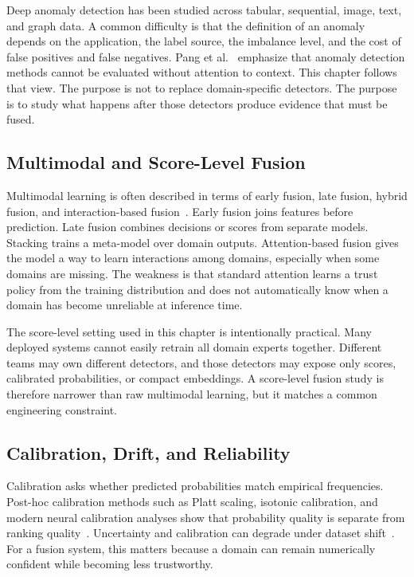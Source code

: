 \documentclass[11pt]{article}
\begin{document}
Deep anomaly detection has been studied across tabular, sequential, image, text,
and graph data. A common difficulty is that the definition of an anomaly depends
on the application, the label source, the imbalance level, and the cost of false
positives and false negatives. Pang et al.~\cite{pang2021deep} emphasize that
anomaly detection methods cannot be evaluated without attention to context. This
chapter follows that view. The purpose is not to replace domain-specific
detectors. The purpose is to study what happens after those detectors produce
evidence that must be fused.

\subsection{Multimodal and Score-Level Fusion}

Multimodal learning is often described in terms of early fusion, late fusion,
hybrid fusion, and interaction-based fusion~\cite{baltrusaitis2019multimodal}.
Early fusion joins features before prediction. Late fusion combines decisions
or scores from separate models. Stacking trains a meta-model over domain
outputs. Attention-based fusion gives the model a way to learn interactions
among domains, especially when some domains are missing. The weakness is that
standard attention learns a trust policy from the training distribution and
does not automatically know when a domain has become unreliable at inference
time.

The score-level setting used in this chapter is intentionally practical. Many
deployed systems cannot easily retrain all domain experts together. Different
teams may own different detectors, and those detectors may expose only scores,
calibrated probabilities, or compact embeddings. A score-level fusion study is
therefore narrower than raw multimodal learning, but it matches a common
engineering constraint.

\subsection{Calibration, Drift, and Reliability}

Calibration asks whether predicted probabilities match empirical frequencies.
Post-hoc calibration methods such as Platt scaling, isotonic calibration, and
modern neural calibration analyses show that probability quality is separate
from ranking quality~\cite{platt1999probabilistic,zadrozny2002transforming,guo2017calibration}.
Uncertainty and calibration can degrade under dataset shift~\cite{ovadia2019can}.
For a fusion system, this matters because a domain can remain numerically
confident while becoming less trustworthy.
\end{document}
